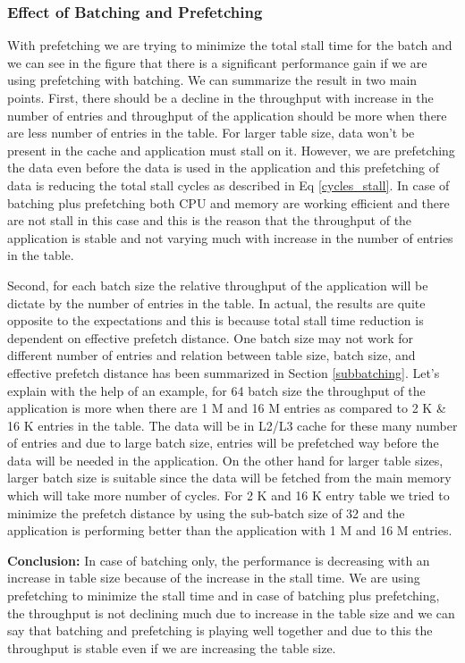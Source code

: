 \subsubsection{Effect of Batching and Prefetching}
\label{prefetchingsubsection}
With prefetching we are trying to minimize the total stall time for the batch and we can see in the figure that there is a significant performance gain if we are using prefetching with batching. We can summarize the result in two main points. First, there should be a decline in the throughput with increase in the number of entries and throughput of the application should be more when there are less number of entries in the table. For larger table size, data won't be present in the cache and application must stall on it. However, we are prefetching the data even before the data is used in the application and this prefetching of data is reducing the total stall cycles as described in Eq \ref{cycles_stall}. In case of batching plus prefetching both CPU and memory are working efficient and there are not stall in this case and this is the reason that the throughput of the application is stable and not varying much with increase in the number of entries in the table. 

Second, for each batch size the relative throughput of the application will be dictate by the number of entries in the table. In actual, the results are quite opposite to the expectations and this is because total stall time reduction is dependent on effective prefetch distance. One batch size may not work for different number of entries and relation between table size, batch size, and effective prefetch distance has been summarized in Section \ref{subbatching}. Let's explain with the help of an example, for 64 batch size the throughput of the application is more when there are 1 M and 16 M entries as compared to 2 K \& 16 K entries in the table. The data will be in L2/L3 cache for these many number of entries and due to large batch size, entries will be prefetched way before the data will be needed in the application. On the other hand for larger table sizes, larger batch size is suitable since the data will be fetched from the main memory which will take more number of cycles. For 2 K and 16 K entry table we tried to minimize the prefetch distance by using the sub-batch size of 32 and the application is performing better than the application with 1 M and 16 M entries. 

\textbf{Conclusion:} 
In case of batching only, the performance is decreasing with an increase in table size because of the increase in the stall time. We are using prefetching to minimize the stall time and in case of batching plus prefetching, the throughput is not declining much due to increase in the table size and we can say that batching and prefetching is playing well together and due to this the throughput is stable even if we are increasing the table size.

